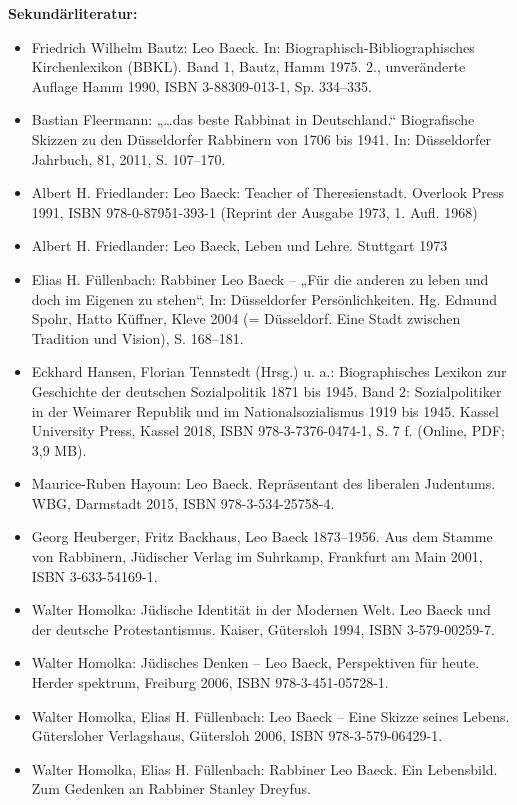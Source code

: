 \documentclass[a4paper]{article}
\begin{document}
\bigskip

\textbf{Sekundärliteratur:}

\begin{itemize}
\item Friedrich Wilhelm Bautz: Leo Baeck. In: Biographisch-Bibliographisches Kirchenlexikon (BBKL). Band 1, Bautz, Hamm
1975. 2., unveränderte Auflage Hamm 1990, ISBN 3-88309-013-1, Sp. 334–335.
\item Bastian Fleermann: „…das beste Rabbinat in Deutschland.“ Biografische Skizzen zu den Düsseldorfer Rabbinern von
1706 bis 1941. In: Düsseldorfer Jahrbuch, 81, 2011, S. 107–170.  
\item Albert H. Friedlander: Leo Baeck: Teacher of Theresienstadt. Overlook Press 1991, ISBN 978-0-87951-393-1 (Reprint
der Ausgabe 1973, 1. Aufl. 1968)  
\item Albert H. Friedlander: Leo Baeck, Leben und Lehre. Stuttgart 1973  
\item Elias H. Füllenbach: Rabbiner Leo Baeck – „Für die anderen zu leben und doch im Eigenen zu stehen“. In:
Düsseldorfer Persönlichkeiten. Hg. Edmund Spohr, Hatto Küffner, Kleve 2004 (= Düsseldorf. Eine Stadt zwischen Tradition
und Vision), S. 168–181.  
\item Eckhard Hansen, Florian Tennstedt (Hrsg.) u. a.: Biographisches Lexikon zur Geschichte der deutschen Sozialpolitik
1871 bis 1945. Band 2: Sozialpolitiker in der Weimarer Republik und im Nationalsozialismus 1919 bis 1945. Kassel
University Press, Kassel 2018, ISBN 978-3-7376-0474-1, S. 7 f. (Online, PDF; 3,9 MB).  
\item Maurice-Ruben Hayoun: Leo Baeck. Repräsentant des liberalen Judentums. WBG, Darmstadt 2015, ISBN
978-3-534-25758-4.  
\item Georg Heuberger, Fritz Backhaus, Leo Baeck 1873–1956. Aus dem Stamme von Rabbinern, Jüdischer Verlag im Suhrkamp,
Frankfurt am Main 2001, ISBN 3-633-54169-1.  
\item Walter Homolka: Jüdische Identität in der Modernen Welt. Leo Baeck und der deutsche Protestantismus. Kaiser,
Gütersloh 1994, ISBN 3-579-00259-7.  
\item Walter Homolka: Jüdisches Denken – Leo Baeck, Perspektiven für heute. Herder spektrum, Freiburg 2006, ISBN
978-3-451-05728-1.  
\item Walter Homolka, Elias H. Füllenbach: Leo Baeck – Eine Skizze seines Lebens. Gütersloher Verlagshaus, Gütersloh
2006, ISBN 978-3-579-06429-1.  
\item Walter Homolka, Elias H. Füllenbach: Rabbiner Leo Baeck. Ein Lebensbild. Zum Gedenken an Rabbiner Stanley Dreyfus.

\end{itemize}
\end{document}
